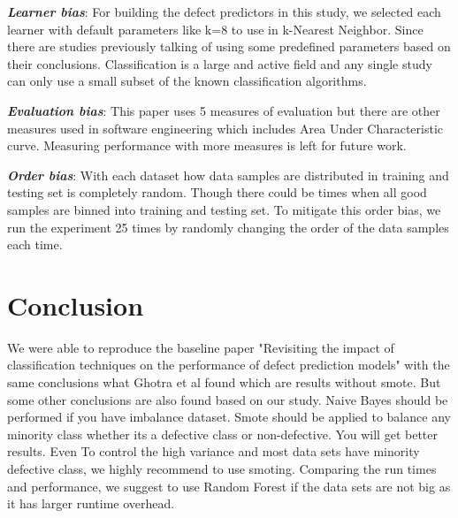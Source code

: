 \documentclass[conference]{IEEEtran}
\begin{document}
\textbf{\textit{Learner bias}}: For building the defect predictors in this
study, we selected each learner with default parameters like k=8 to use in k-Nearest Neighbor. Since there are studies previously talking of using some predefined parameters based on their conclusions. Classification is a large and active field and any single study can only use a small subset of the known classification algorithms.

\textbf{\textit{Evaluation bias}}: This paper uses 5 measures of evaluation but there are other measures used in software engineering which
includes Area Under Characteristic curve. Measuring performance with more measures is left for future work.

\textbf{\textit{Order bias}}: With each dataset how data samples are distributed in training and testing set is completely random. Though there could be times when all good samples are binned into training and testing set. To mitigate this order bias, we run
the experiment 25 times by randomly changing the order of the data samples each time.


\section{Conclusion}
\label{conclusion}

We were able to reproduce the baseline paper "Revisiting the impact of classification techniques on the performance of defect prediction models" with the same conclusions what Ghotra et al found which are results without smote. But some other conclusions are also found based on our study. Naive Bayes should be performed if you have imbalance dataset. Smote should be applied to balance any minority class whether its a defective class or non-defective. You will get better results. Even To control the high variance and most data sets have minority defective class, we highly recommend to use smoting. Comparing the run times and performance, we suggest to use Random Forest if the data sets are not big as it has larger runtime overhead.
\end{document}
